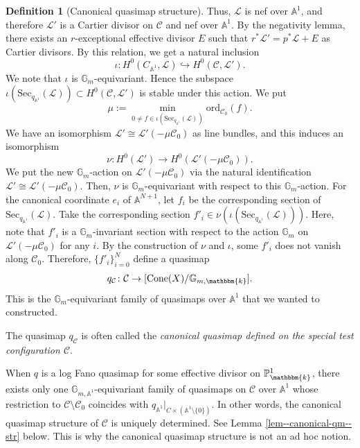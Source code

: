 \documentclass[12pt,twoside]{amsart}
\theoremstyle{definition}
\newtheorem{defn}[thm]{Definition}
\begin{document}
\begin{defn}[Canonical quasimap structure]
Thus, $\mathscr{L}$ is nef over $\mathbb{A}^1$, and therefore $\mathscr{L}'$ is a Cartier divisor on $\mathcal{C}$ and nef over $\mathbb{A}^1$.  
By the negativity lemma, there exists an $r$-exceptional effective divisor $E$ such that $r^*\mathscr{L}'=p^*\mathscr{L}+E$ as Cartier divisors. By this relation, we get a natural inclusion 
$$\iota\colon H^0(C_{\mathbb{A}^1},\mathscr{L})\hookrightarrow H^0(\mathcal{C},\mathscr{L}').$$
We note that $\iota$ is $\mathbb{G}_{m}$-equivariant. 
Hence the subspace $\iota(\mathrm{Sec}_{q_{\mathbb{A}^1}}(\mathscr{L}))\subset  H^0(\mathcal{C},\mathscr{L}')$ is stable under this action.
We put 
$$\mu :=\underset{0\ne f\in\iota(\mathrm{Sec}_{q_{\mathbb{A}^1}}(\mathscr{L}))}{\min}\mathrm{ord}_{\mathcal{C}_0}(f).$$
We have an isomorphism $\mathscr{L}'\cong\mathscr{L}'(-\mu\mathcal{C}_0)$ as line bundles, and this induces an isomorphism 
$$\nu \colon H^0(\mathscr{L}')\to H^0(\mathscr{L}'(-\mu\mathcal{C}_0)).$$
We put the new $\mathbb{G}_m$-action on $\mathscr{L}'(-\mu\mathcal{C}_0)$ via the natural identification $\mathscr{L}'\cong\mathscr{L}'(-\mu\mathcal{C}_0)$.
Then, $\nu$ is $\mathbb{G}_m$-equivariant with respect to this $\mathbb{G}_m$-action.
For the canonical coordinate $e_i$ of $\mathbb{A}^{N+1}$, let $f_i$ be the corresponding section of $\mathrm{Sec}_{q_{\mathbb{A}^1}}(\mathscr{L})$.
Take the corresponding section $f'_i\in \nu(\iota(\mathrm{Sec}_{q_{\mathbb{A}^1}}(\mathscr{L})))$.
Here, note that $f'_i$ is a $\mathbb{G}_m$-invariant section with respect to the action $\mathbb{G}_m$ on $\mathscr{L}'(-\mu\mathcal{C}_0)$ for any $i$.
By the construction of $\nu$ and $\iota$, some $f'_i$ does not vanish along $\mathcal{C}_0$.
Therefore, $\{f'_i\}_{i=0}^N$ define a quasimap
$$q_{\mathcal{C}}\colon \mathcal{C}\to[\mathrm{Cone}(X)/\mathbb{G}_{m, \mathbbm{k}}].$$ 
This is the $\mathbb{G}_m$-equivariant family of quasimaps over $\mathbb{A}^1$ that we wanted to constructed. 

The quasimap $q_{\mathcal{C}}$ is often called the {\it canonical quasimap defined on the special test configuration $\mathcal{C}$}.
\end{defn}


When $q$ is a log Fano quasimap for some effective divisor on $\mathbb{P}^{1}_{\mathbbm{k}}$, there exists only one $\mathbb{G}_{m, \mathbb{A}^1}$-equivariant family of quasimaps on $\mathcal{C}$ over $\mathbb{A}^1$ whose restriction to $\mathcal{C}\setminus\mathcal{C}_0$ coincides with $q_{\mathbb{A}^1}|_{C\times(\mathbb{A}^1\setminus\{0\})}$. In other words, the canonical quasimap structure of $\mathcal{C}$ is uniquely determined. 
See Lemma \ref{lem--canonical-qm--str} below.
This is why the canonical quasimap structure is not an ad hoc notion.
\end{document}
